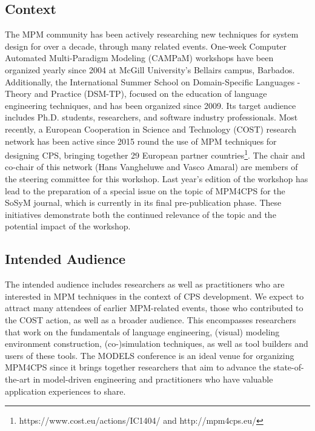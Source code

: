 \subsection{Context}
The MPM community has been actively researching new techniques for system design 
for over a decade, through many related events.
One-week Computer Automated Multi-Paradigm Modeling (CAMPaM) workshops have been 
organized yearly since 2004 at McGill University’s Bellairs campus, Barbados. 
Additionally, the International Summer School on Domain-Specific Languages - 
Theory and Practice (DSM-TP), focused on the education of language engineering 
techniques, and has been organized since 2009.
Its target audience includes Ph.D. students, researchers, and software industry 
professionals.
Most recently, a European Cooperation in Science and Technology (COST) research 
network has been active since 2015 round the use of MPM techniques for designing 
CPS, bringing together 29 European partner countries\footnote{https://www.cost.eu/actions/IC1404/ 
and http://mpm4cps.eu/}.
The chair and co-chair of this network (Hans Vangheluwe and Vasco Amaral) are 
members of the steering committee for this workshop.
Last year's edition of the workshop has lead to the preparation of a special issue on the topic of MPM4CPS for the SoSyM journal, which is currently in its final pre-publication phase.
These initiatives demonstrate both the continued relevance of the topic and the 
potential impact of the workshop.


\subsection{Intended Audience}
The intended audience includes researchers as well as practitioners who are 
interested in MPM techniques in the context of CPS development.
We expect to attract many attendees of earlier MPM-related events, those who 
contributed to the COST action, as well as a broader audience.
This encompasses researchers that work on the fundamentals of language 
engineering, (visual) modeling environment construction, (co-)simulation 
techniques, as well as tool builders and users of these tools.
The MODELS conference is an ideal venue for organizing MPM4CPS since it brings 
together researchers that aim to advance the state-of-the-art in model-driven 
engineering and practitioners who have valuable application experiences to share.

